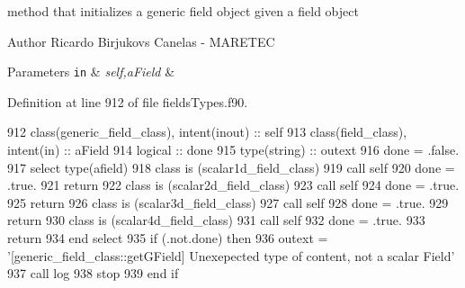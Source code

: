 method that initializes a generic field object given a field object 

\begin{DoxyAuthor}{Author}
Ricardo Birjukovs Canelas -\/ M\+A\+R\+E\+T\+EC 
\end{DoxyAuthor}

\begin{DoxyParams}[1]{Parameters}
\mbox{\tt in}  & {\em self,a\+Field} & \\
\hline
\end{DoxyParams}


Definition at line 912 of file fields\+Types.\+f90.


\begin{DoxyCode}
912     \textcolor{keywordtype}{class}(generic\_field\_class), \textcolor{keywordtype}{intent(inout)} :: self
913     \textcolor{keywordtype}{class}(field\_class), \textcolor{keywordtype}{intent(in)} :: aField
914     \textcolor{keywordtype}{logical} :: done
915     \textcolor{keywordtype}{type}(string) :: outext
916     done = .false.
917     \textcolor{keywordflow}{select type}(afield)
918 \textcolor{keywordflow}{    class is} (scalar1d\_field\_class)
919         \textcolor{keyword}{call }self%
920         done = .true.
921         \textcolor{keywordflow}{return}
922 \textcolor{keywordflow}{    class is} (scalar2d\_field\_class)
923         \textcolor{keyword}{call }self%
924         done = .true.
925         \textcolor{keywordflow}{return}
926 \textcolor{keywordflow}{    class is} (scalar3d\_field\_class)
927         \textcolor{keyword}{call }self%
928         done = .true.
929         \textcolor{keywordflow}{return}
930 \textcolor{keywordflow}{    class is} (scalar4d\_field\_class)
931         \textcolor{keyword}{call }self%
932         done = .true.
933         \textcolor{keywordflow}{return}
934 \textcolor{keywordflow}{    end select}
935     \textcolor{keywordflow}{if} (.not.done) \textcolor{keywordflow}{then}
936         outext = \textcolor{stringliteral}{'[generic\_field\_class::getGField] Unexepected type of content, not a scalar Field'}
937         \textcolor{keyword}{call }log%
938         stop
939 \textcolor{keywordflow}{    end if}
\end{DoxyCode}
\mbox{\label{namespacefieldtypes__mod_abd34452f9afd91c4b9eeb60c51908312}} 
